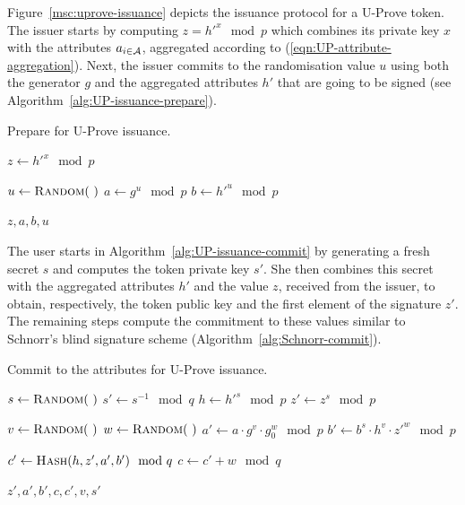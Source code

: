 Figure~\ref{msc:uprove-issuance} depicts the issuance protocol for a U-Prove
token. The issuer starts by computing $z = h'^x \mod p$ which combines its
private key $x$ with the attributes $a_{i \in \mathcal{A}}$, aggregated according to
(\ref{eqn:UP-attribute-aggregation}). Next, the issuer commits to the
randomisation value $u$ using both the generator $g$ and the aggregated
attributes $h'$ that are going to be signed (see
Algorithm~\ref{alg:UP-issuance-prepare}).

\begin{algorithm}
  \caption{Prepare for U-Prove issuance.}
  \label{alg:UP-issuance-prepare}
  \addtolength{\baselineskip}{1mm}
  \begin{algorithmic}[1]
      \State $z \gets h'^x \mod p$

      \State $u \gets \Call{Random}{~}$
      \State $a \gets g^u \mod p$
      \State $b \gets h'^u \mod p$

      \Return $z, a, b, u$
    \EndFunction
  \end{algorithmic}
\end{algorithm}

The user starts in Algorithm~\ref{alg:UP-issuance-commit} by generating a fresh
secret $s$ and computes the token private key $s'$. She then combines this
secret with the aggregated attributes $h'$ and the value $z$, received from the
issuer, to obtain, respectively, the token public key and the first element of
the signature $z'$. The remaining steps compute the commitment to these values
similar to Schnorr's blind signature scheme (Algorithm~\ref{alg:Schnorr-commit}).

\begin{algorithm}
  \caption{Commit to the attributes for U-Prove issuance.}
  \label{alg:UP-issuance-commit}
  \addtolength{\baselineskip}{1mm}
  \begin{algorithmic}[1]
      \State $s \gets \Call{Random}{~}$
      \State $s' \gets s^{-1} \mod q$
      \State $h \gets h'^s \mod p$
      \State $z' \gets z^s \mod p$

      \State $v \gets \Call{Random}{~}$
      \State $w \gets \Call{Random}{~}$
      \State $a' \gets a \cdot g^v \cdot g_0^w \mod p$
      \State $b' \gets b^s \cdot h^v \cdot z'^w \mod p$

      \State $c' \gets \Call{Hash}{h, z', a', b'} \mod q$
      \State $c \gets c' + w \mod q$

      \Return $z', a', b', c, c', v, s'$
    \EndFunction
  \end{algorithmic}
\end{algorithm}


